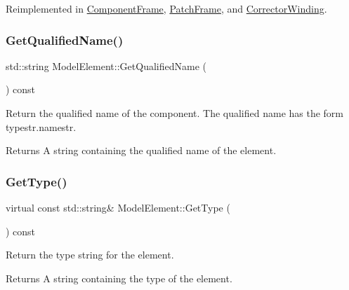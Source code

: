 Reimplemented in \hyperlink{classComponentFrame_a32bc80a48e64f286ee07519e17220248}{Component\+Frame}, \hyperlink{classPatchFrame_a51ebb7649aa5fc1403bcd70925d7c85f}{Patch\+Frame}, and \hyperlink{classCorrectorWinding_afb8a04514388b2b9b0e640b606f8f47c}{Corrector\+Winding}.

\mbox{\label{classModelElement_a838ca2cdb62831a812704e6a9a9c7401}} 
\subsubsection{\texorpdfstring{Get\+Qualified\+Name()}{GetQualifiedName()}}
{\footnotesize\ttfamily std\+::string Model\+Element\+::\+Get\+Qualified\+Name (\begin{DoxyParamCaption}{ }\end{DoxyParamCaption}) const\hspace{0.3cm}{\ttfamily [inline]}}

Return the qualified name of the component. The qualified name has the form typestr.\+namestr. \begin{DoxyReturn}{Returns}
A string containing the qualified name of the element. 
\end{DoxyReturn}
\mbox{\label{classModelElement_a04dc2e51e1999fca612eb1838ec6b271}} 
\subsubsection{\texorpdfstring{Get\+Type()}{GetType()}}
{\footnotesize\ttfamily virtual const std\+::string\& Model\+Element\+::\+Get\+Type (\begin{DoxyParamCaption}{ }\end{DoxyParamCaption}) const\hspace{0.3cm}{\ttfamily [pure virtual]}}

Return the type string for the element. \begin{DoxyReturn}{Returns}
A string containing the type of the element. 
\end{DoxyReturn}


